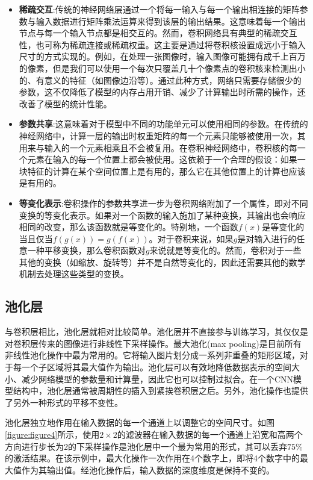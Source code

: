 \begin{itemize}
  \item \textbf{稀疏交互}:传统的神经网络层通过一个将每一输入与每一个输出相连接的矩阵参数与输入数据进行矩阵乘法运算来得到该层的输出结果。这意味着每一个输出节点与每一个输入节点都是相交互的。然而，卷积网络具有典型的稀疏交互性，也可称为稀疏连接或稀疏权重。这主要是通过将卷积核设置成远小于输入尺寸的方式实现的。例如，在处理一张图像时，输入图像可能拥有成千上百万的像素，但是我们可以使用一个每次只覆盖几十个像素点的卷积核来检测出小的、有意义的特征（如图像边沿等）。通过此种方式，网络只需要存储很少的参数，这不仅降低了模型的内存占用开销、减少了计算输出时所需的操作，还改善了模型的统计性能。
  \item  \textbf{参数共享}:这意味着对于模型中不同的功能单元可以使用相同的参数。在传统的神经网络中，计算一层的输出时权重矩阵的每一个元素只能够被使用一次，其用来与输入的一个元素相乘且不会被复用。在卷积神经网络中，卷积核的每一个元素在输入的每一个位置上都会被使用。这依赖于一个合理的假设：如果一块特征的计算在某个空间位置上是有用的，那么它在其他位置上的计算也应该是有用的。
  \item \textbf{等变化表示}:卷积操作的参数共享进一步为卷积网络附加了一个属性，即对不同变换的等变化表示。如果对一个函数的输入施加了某种变换，其输出也会响应相同的改变，那么该函数就是等变化的。特别地，一个函数$f(x)$是等变化的当且仅当$f(g(x))=g(f(x))$。对于卷积来说，如果$g$是对输入进行的任意一种平移变换，那么卷积函数对$g$来说就是等变化的。然而，卷积对于一些其他的变换（如缩放、旋转等）并不是自然等变化的，因此还需要其他的数学机制去处理这些类型的变换。
\end{itemize}

\subsection{池化层}
\label{chapter:chapter2-1-2}
与卷积层相比，池化层就相对比较简单。池化层并不直接参与训练学习，其仅仅是对卷积层传来的图像进行非线性下采样操作。最大池化(max pooling)是目前所有非线性池化操作中最为常用的。它将输入图片划分成一系列非重叠的矩形区域，对于每一个子区域将其最大值作为输出。池化层可以有效地降低数据表示的空间大小、减少网络模型的参数量和计算量，因此它也可以控制过拟合。在一个CNN模型结构中，池化层通常被周期性的插入到紧挨卷积层之后。另外，池化操作也提供了另外一种形式的平移不变性。

池化层独立地作用在输入数据的每一个通道上以调整它的空间尺寸。如图\ref{figure:figure4}所示，使用$2\times2$的滤波器在输入数据的每一个通道上沿宽和高两个方向进行步长为2的下采样操作是池化层中一个最为常用的形式，其可以丢弃$75\%$的激活结果。在该示例中，最大化操作一次作用在4个数字上，即将4个数字中的最大值作为其输出值。经池化操作后，输入数据的深度维度是保持不变的。

